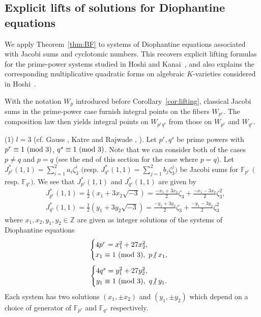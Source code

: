 \documentclass[a4paper, 11pt]{amsart}
\newcommand{\notmid}{\mathrel{\ooalign{$\mkern-5mu\not$\crcr$|$}}}
\newcommand{\Z}{\mathbb Z}
\newcommand{\F}{\mathbb F}
\theoremstyle{plain}
\theoremstyle{definition}
\numberwithin{equation}{section}
\begin{document}
\subsection{Explicit lifts of solutions for Diophantine equations}\label{S4-3}

We apply Theorem~\ref{thm:BF} to systems of Diophantine equations associated with Jacobi sums and cyclotomic numbers. 
This recovers explicit lifting formulas for the prime-power systems studied in Hoshi and Kanai~\cite{HK22}, and also explains the corresponding multiplicative quadratic forms on algebraic $K$-varieties considered in Hoshi~\cite{Hos03}.

With the notation $W_p$ introduced before Corollary~\ref{cor:lifting}, 
classical Jacobi sums in the prime-power case furnish integral points on the fibers $W_{p^r}$. 
The composition law then yields integral points on $W_{p^r q^s}$ from those on $W_{p^r}$ and $W_{q^s}$.

(1) $l=3$ (cf. Gauss \cite[Section 358]{Gau1801}, Katre and Rajwade \cite[Proposition~1]{KR85a}, \cite[Section 3.1, Section 10.10]{BEW98}). 
Let $p^r, q^s$ be prime powers with $p^r\equiv 1\ ({\rm mod}\ 3)$, $q^s\equiv 1\ ({\rm mod}\ 3)$. 
Note that we can consider both of the cases $p\neq q$ 
and $p=q$ (see the end of this section for the case where $p=q$).  
Let
$J^\ast_{p^r}(1,1)=\sum_{i=1}^{2}a_{i}\zeta_3^{i}$ $($resp. $J^\ast_{q^s}(1,1)=\sum_{j=1}^{2}b_{j}\zeta_3^{j}$$)$ 
be Jacobi sums for $\F_{p^r}$ $($resp. $\F_{q^s}$$)$. 
We see that $J^\ast_{p^r}(1,1)$ and $J^\ast_{q^s}(1,1)$ are given by 
\begin{align*}
&J^\ast_{p^r}(1,1)
=\frac{1}{2}(x_1+3x_2\sqrt{-3})
=\frac{-x_1+3x_2}{2}\zeta_3 + \frac{-x_1-3x_2}{2}\zeta_3^2,\\
&J^\ast_{q^s}(1,1)
=\frac{1}{2}(y_1+3y_2\sqrt{-3})
=\frac{-y_1+3y_2}{2}\zeta_3 + \frac{-y_1-3y_2}{2}\zeta_3^2
\end{align*}
where $x_1,x_2,y_1,y_2 \in\Z$ are given as integer solutions of the systems of Diophantine equations
\begin{align}\label{eq:DS3p}
\begin{cases}
4p^r=x_1^2+27x_2^2,\\
x_1\equiv 1\ ({\rm mod}\ 3),\ p\notmid x_1,
\end{cases}
\end{align}
\begin{align*} %
\begin{cases}
4q^s=y_1^2+27y_2^2,\\
y_1\equiv 1\ ({\rm mod}\ 3),\ q\notmid y_1. 
\end{cases}
\end{align*}
Each system has two solutions $(x_1,\pm x_2)$ and $(y_1,\pm y_2)$ 
which depend on a choice of generator of 
$\F_{p^r}$ and $\F_{q^s}$ respectively.
\end{document}
